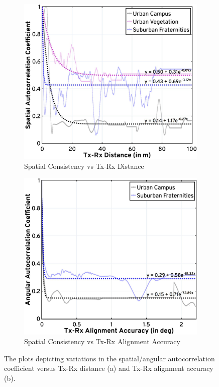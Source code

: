 \documentclass[12pt, draftcls, onecolumn]{IEEEtran}
\begin{document}
\begin{figure} [t]
     \centering
     \begin{subfigure}{0.497\linewidth}
         \centering
         \includegraphics[width=1.0\linewidth]{figs/sc_distance_updated.jpg}
         \caption{Spatial Consistency vs Tx-Rx Distance}
         \label{F8a}
     \end{subfigure}
     \begin{subfigure}{0.493\linewidth}
         \centering
         \includegraphics[width=1.0\linewidth]{figs/sc_alignment_updated.jpg}
         \caption{Spatial Consistency vs Tx-Rx Alignment Accuracy}
         \label{F8b}
     \end{subfigure}
     \vspace{-2mm}
     \caption{The plots depicting variations in the spatial/angular autocorrelation coefficient versus Tx-Rx distance (a) and Tx-Rx alignment accuracy (b).}
     \label{F8}
\end{figure}
\vspace{-4mm}
\end{document}
